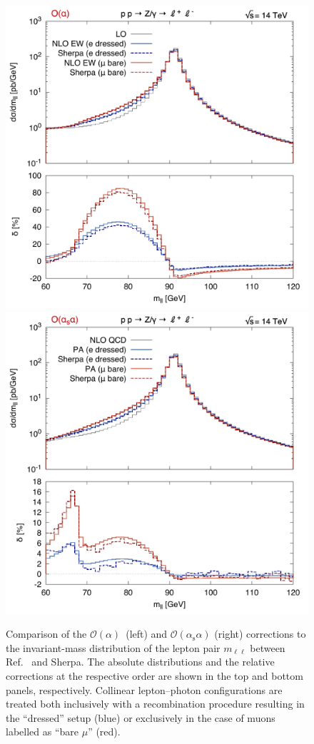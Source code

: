 \documentclass[11pt]{cernrep}
\newcommand{\order}{\ensuremath{\mathcal{O}}}
\newcommand{\alphas}{\ensuremath{\alpha_\mathrm{s}}}
\DeclareRobustCommand{\Pl}{{\ensuremath{\ell}}}
\begin{document}
\begin{figure}
  \includegraphics[width=.48\linewidth]{images/Z_mll2_LO.pdf} \hfill
  \includegraphics[width=.48\linewidth]{images/Z_mll2_NLO.pdf} 
  \caption{
    Comparison of the $\order(\alpha)$~(left) and $\order(\alphas\alpha)$ 
    (right) corrections to the invariant-mass distribution of the lepton 
    pair $m_{\Pl\Pl}$ between Ref.~\cite{Dittmaier:2015rxo} and Sherpa. 
    The absolute distributions and the relative corrections at the 
    respective order are shown in the top and bottom panels, respectively. 
    Collinear lepton--photon configurations are treated both inclusively 
    with a recombination procedure resulting in the ``dressed'' setup 
    (blue) or exclusively in the case of muons labelled as ``bare $\mu$'' 
    (red).
  }
  \label{fig:dyew:mll}
\end{figure}
\end{document}

